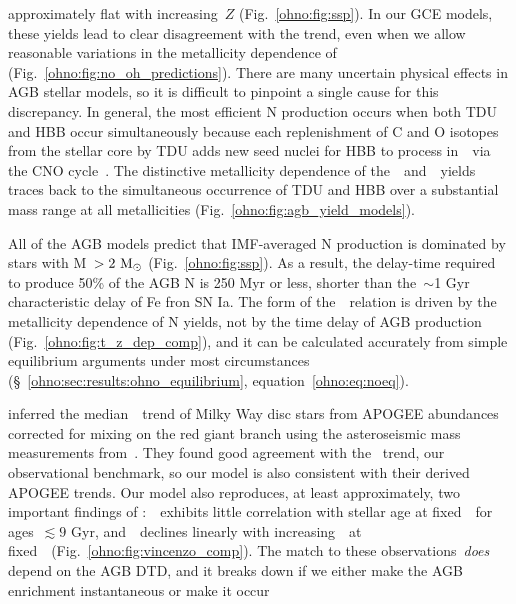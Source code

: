 approximately flat with increasing~$Z$ (Fig.~\ref{ohno:fig:ssp}).
In our GCE models, these yields lead to clear disagreement with the
\citet{Dopita2016} trend, even when we allow reasonable variations in the
metallicity dependence of~ (Fig.~\ref{ohno:fig:no_oh_predictions}).
There are many uncertain physical effects in AGB stellar models, so it is
difficult to pinpoint a single cause for this discrepancy.
In general, the most efficient N production occurs when both TDU and HBB occur
simultaneously because each replenishment of C and O isotopes from the stellar
core by TDU adds new seed nuclei for HBB to process in~\Nfourteen~via the CNO
cycle~\citep{Ventura2013}.
The distinctive metallicity dependence of the~\karakasten~and~\karakas~yields
traces back to the simultaneous occurrence of TDU and HBB over a substantial
mass range at all metallicities (Fig.~\ref{ohno:fig:agb_yield_models}).
\par
All of the AGB models predict that IMF-averaged N production is dominated by
stars with M~$> 2~\text{M}_\odot$ (Fig.~\ref{ohno:fig:ssp}).
As a result, the delay-time required to produce 50\% of the AGB N is 250 Myr or
less, shorter than the~$\sim$1 Gyr characteristic delay of Fe fron SN Ia.
The form of the~\ohno~relation is driven by the metallicity dependence of N
yields, not by the time delay of AGB production (Fig.~\ref{ohno:fig:t_z_dep_comp}),
and it can be calculated accurately from simple equilibrium arguments under
most circumstances (\S~\ref{ohno:sec:results:ohno_equilibrium},
equation~\ref{ohno:eq:noeq}).
\par
\citet{Vincenzo2021b} inferred the median~\ohno~trend of Milky Way disc stars
from APOGEE abundances corrected for mixing on the red giant branch using the
asteroseismic mass measurements from~\citet{Miglio2021}.
They found good agreement with the~\citet{Dopita2016} trend, our observational
benchmark, so our model is also consistent with their derived APOGEE trends.
Our model also reproduces, at least approximately, two important findings of
\citet{Vincenzo2021b}:~\no~exhibits little correlation with stellar age at
fixed~\feh~for ages~$\lesssim 9$ Gyr, and~\no~declines linearly with
increasing~\ofe~at fixed~\oh~(Fig.~\ref{ohno:fig:vincenzo_comp}).
The match to these observations~\textit{does} depend on the AGB DTD, and it
breaks down if we either make the AGB enrichment instantaneous or make it occur
